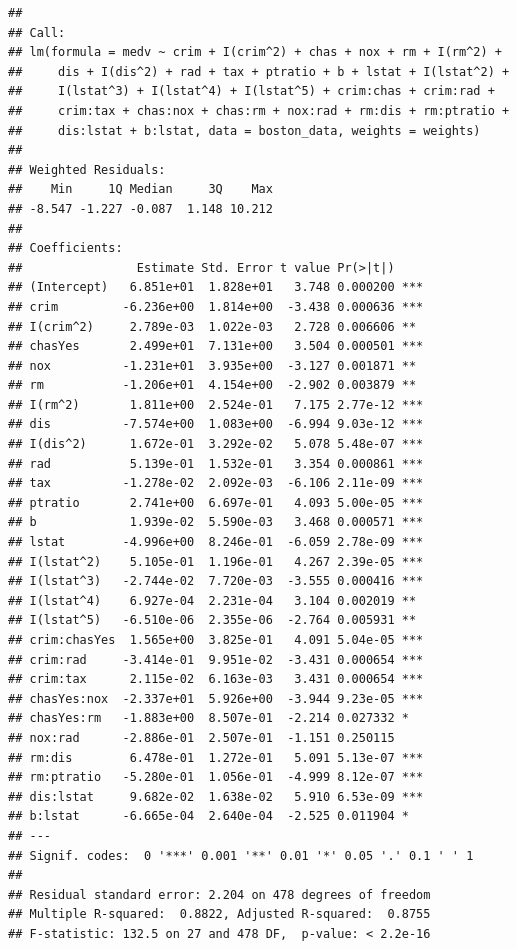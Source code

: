 \documentclass[
]{article}
\begin{document}
\begin{verbatim}
## 
## Call:
## lm(formula = medv ~ crim + I(crim^2) + chas + nox + rm + I(rm^2) + 
##     dis + I(dis^2) + rad + tax + ptratio + b + lstat + I(lstat^2) + 
##     I(lstat^3) + I(lstat^4) + I(lstat^5) + crim:chas + crim:rad + 
##     crim:tax + chas:nox + chas:rm + nox:rad + rm:dis + rm:ptratio + 
##     dis:lstat + b:lstat, data = boston_data, weights = weights)
## 
## Weighted Residuals:
##    Min     1Q Median     3Q    Max 
## -8.547 -1.227 -0.087  1.148 10.212 
## 
## Coefficients:
##                Estimate Std. Error t value Pr(>|t|)    
## (Intercept)   6.851e+01  1.828e+01   3.748 0.000200 ***
## crim         -6.236e+00  1.814e+00  -3.438 0.000636 ***
## I(crim^2)     2.789e-03  1.022e-03   2.728 0.006606 ** 
## chasYes       2.499e+01  7.131e+00   3.504 0.000501 ***
## nox          -1.231e+01  3.935e+00  -3.127 0.001871 ** 
## rm           -1.206e+01  4.154e+00  -2.902 0.003879 ** 
## I(rm^2)       1.811e+00  2.524e-01   7.175 2.77e-12 ***
## dis          -7.574e+00  1.083e+00  -6.994 9.03e-12 ***
## I(dis^2)      1.672e-01  3.292e-02   5.078 5.48e-07 ***
## rad           5.139e-01  1.532e-01   3.354 0.000861 ***
## tax          -1.278e-02  2.092e-03  -6.106 2.11e-09 ***
## ptratio       2.741e+00  6.697e-01   4.093 5.00e-05 ***
## b             1.939e-02  5.590e-03   3.468 0.000571 ***
## lstat        -4.996e+00  8.246e-01  -6.059 2.78e-09 ***
## I(lstat^2)    5.105e-01  1.196e-01   4.267 2.39e-05 ***
## I(lstat^3)   -2.744e-02  7.720e-03  -3.555 0.000416 ***
## I(lstat^4)    6.927e-04  2.231e-04   3.104 0.002019 ** 
## I(lstat^5)   -6.510e-06  2.355e-06  -2.764 0.005931 ** 
## crim:chasYes  1.565e+00  3.825e-01   4.091 5.04e-05 ***
## crim:rad     -3.414e-01  9.951e-02  -3.431 0.000654 ***
## crim:tax      2.115e-02  6.163e-03   3.431 0.000654 ***
## chasYes:nox  -2.337e+01  5.926e+00  -3.944 9.23e-05 ***
## chasYes:rm   -1.883e+00  8.507e-01  -2.214 0.027332 *  
## nox:rad      -2.886e-01  2.507e-01  -1.151 0.250115    
## rm:dis        6.478e-01  1.272e-01   5.091 5.13e-07 ***
## rm:ptratio   -5.280e-01  1.056e-01  -4.999 8.12e-07 ***
## dis:lstat     9.682e-02  1.638e-02   5.910 6.53e-09 ***
## b:lstat      -6.665e-04  2.640e-04  -2.525 0.011904 *  
## ---
## Signif. codes:  0 '***' 0.001 '**' 0.01 '*' 0.05 '.' 0.1 ' ' 1
## 
## Residual standard error: 2.204 on 478 degrees of freedom
## Multiple R-squared:  0.8822, Adjusted R-squared:  0.8755 
## F-statistic: 132.5 on 27 and 478 DF,  p-value: < 2.2e-16
\end{verbatim}
\end{document}
